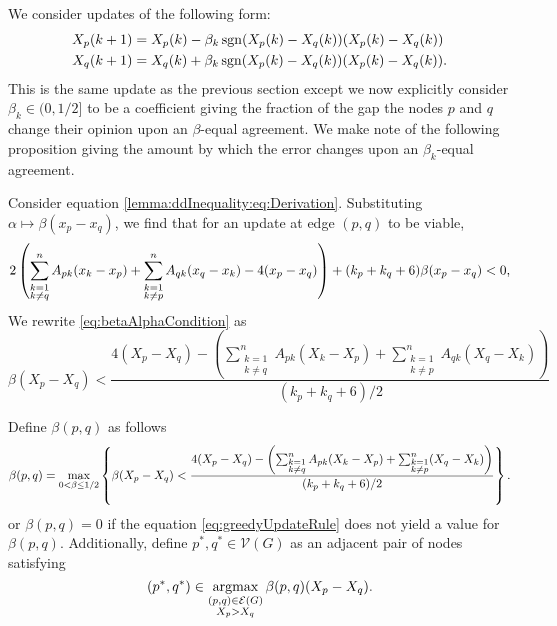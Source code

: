 \documentclass{article}
\theoremstyle{remark}
\DeclareMathOperator{\sgn}{sgn}
\DeclareMathOperator*{\argmax}{argmax}
\begin{document}
We consider updates of the following form:
\begin{equation}{\label{eq:generalUpdateRule2}}
\begin{aligned}
	X_p(k+1) &= X_p(k) - \beta_k\sgn(X_p(k)-X_q(k))(X_p(k)-X_q(k))\\
	X_q(k+1) &= X_q(k) + \beta_k\sgn(X_p(k)-X_q(k))(X_p(k)-X_q(k)).
\end{aligned}
\end{equation}
This is the same update as the previous section except we now explicitly consider $\beta_k\in(0,1/2]$ to be a coefficient giving the fraction of the gap the nodes $p$ and $q$ change their opinion upon an $\beta$-equal agreement. We make note of the following proposition giving the amount by which the error changes upon an $\beta_k$-equal agreement.

Consider equation \eqref{lemma:ddInequality:eq:Derivation}.  Substituting $\alpha\mapsto\beta(x_p-x_q)$, we find that for an update at edge $(p,q)$ to be viable,
\begin{equation}{\label{eq:betaAlphaCondition}}
	2\left(\sum_{\substack{k=1\\k\neq q}}^nA_{pk}(x_k-x_p) + \sum_{\substack{k=1\\k\neq p}}^nA_{qk}(x_q-x_k) - 4(x_p-x_q)\right) + (k_p+k_q+6)\beta(x_p-x_q) < 0,
\end{equation}
We rewrite \eqref{eq:betaAlphaCondition} as
\begin{equation}
	\beta(X_p-X_q) < \frac{4(X_p-X_q) - \left(\sum_{\substack{k=1\\k\neq q}}^nA_{pk}(X_k-X_p) + \sum_{\substack{k=1\\k\neq p}}^nA_{qk}(X_q-X_k)\right)}{(k_p+k_q+6)/2} 
\end{equation}

Define $\beta(p,q)$ as follows
\begin{equation}{\label{eq:greedyUpdateRule}}
	\beta(p,q)= \max_{0<\beta\leq 1/2}\left\{\beta(X_p-X_q) < \frac{4(X_p-X_q) - \left(\sum_{\substack{k=1\\k\neq q}}^nA_{pk}(X_k-X_p) + \sum_{\substack{k=1\\k\neq p}}^n(X_q-X_k)\right)}{(k_p+k_q+6)/2}\right\}. 
\end{equation}
or $\beta(p,q) = 0$ if the equation \eqref{eq:greedyUpdateRule} does not yield a value for $\beta(p,q)$.  Additionally, define $p^*,q^*\in\mathcal{V}(G)$ as an adjacent pair of nodes satisfying
\begin{equation}{\label{eq:greedyUpdateRule2}}
	(p^*,q^*) \in \argmax_{\substack{(p,q)\in\mathcal{E}(G)\\X_p>X_q}}\beta(p,q)(X_p-X_q).
\end{equation}
\end{document}
